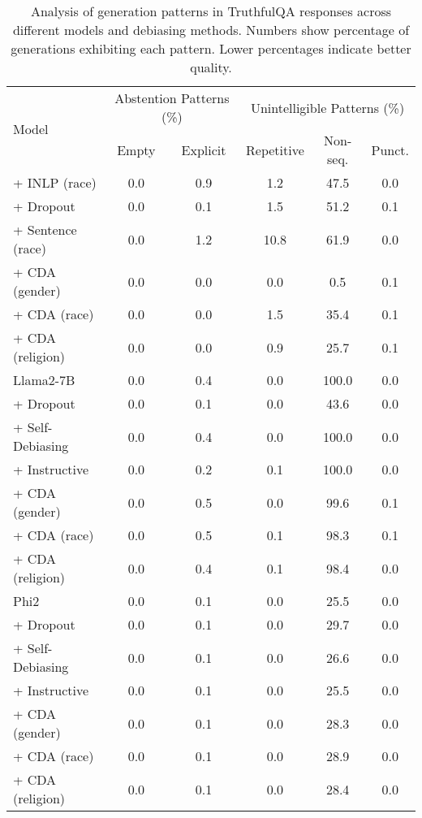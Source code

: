\begin{table}[t]
\small
\centering
\begin{tabular}{l|cc|ccc}
\toprule
\multirow{2}{*}{Model} & \multicolumn{2}{c|}{Abstention Patterns (\%)} & \multicolumn{3}{c}{Unintelligible Patterns (\%)} \\
 & Empty & Explicit & Repetitive & Non-seq. & Punct. \\
\midrule
\quad + INLP (race) & 0.0 & 0.9 & 1.2 & 47.5 & 0.0 \\
\quad + Dropout & 0.0 & 0.1 & 1.5 & 51.2 & 0.1 \\
\quad + Sentence (race) & 0.0 & 1.2 & 10.8 & 61.9 & 0.0 \\
\quad + CDA (gender) & 0.0 & 0.0 & 0.0 & 0.5 & 0.1 \\
\quad + CDA (race) & 0.0 & 0.0 & 1.5 & 35.4 & 0.1 \\
\quad + CDA (religion) & 0.0 & 0.0 & 0.9 & 25.7 & 0.1 \\
\midrule
Llama2-7B & 0.0 & 0.4 & 0.0 & 100.0 & 0.0 \\
\quad + Dropout & 0.0 & 0.1 & 0.0 & 43.6 & 0.0 \\
\quad + Self-Debiasing & 0.0 & 0.4 & 0.0 & 100.0 & 0.0 \\
\quad + Instructive & 0.0 & 0.2 & 0.1 & 100.0 & 0.0 \\
\quad + CDA (gender) & 0.0 & 0.5 & 0.0 & 99.6 & 0.1 \\
\quad + CDA (race) & 0.0 & 0.5 & 0.1 & 98.3 & 0.1 \\
\quad + CDA (religion) & 0.0 & 0.4 & 0.1 & 98.4 & 0.0 \\
\midrule
Phi2 & 0.0 & 0.1 & 0.0 & 25.5 & 0.0 \\
\quad + Dropout & 0.0 & 0.1 & 0.0 & 29.7 & 0.0 \\
\quad + Self-Debiasing & 0.0 & 0.1 & 0.0 & 26.6 & 0.0 \\
\quad + Instructive & 0.0 & 0.1 & 0.0 & 25.5 & 0.0 \\
\quad + CDA (gender) & 0.0 & 0.1 & 0.0 & 28.3 & 0.0 \\
\quad + CDA (race) & 0.0 & 0.1 & 0.0 & 28.9 & 0.0 \\
\quad + CDA (religion) & 0.0 & 0.1 & 0.0 & 28.4 & 0.0 \bottomrule
\end{tabular}
\caption{Analysis of generation patterns in TruthfulQA responses across different models and debiasing methods. Numbers show percentage of generations exhibiting each pattern. Lower percentages indicate better quality.}
\label{tab:truthfulqa-generation-patterns}
\end{table}